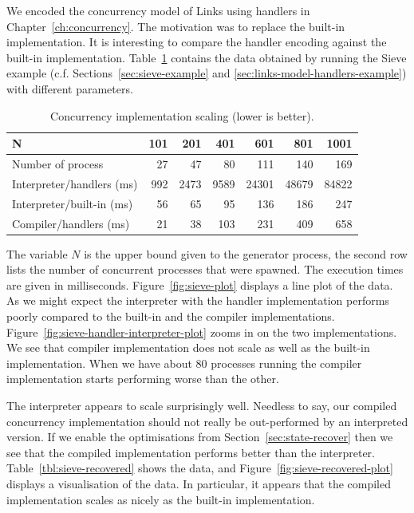 \documentclass[12pt,mscres,cdtppar,twoside,openright,logo,rightchapter,normalheadings]{infthesis}
\theoremstyle{definition}
\begin{document}
We encoded the concurrency model of Links using handlers in
Chapter~\ref{ch:concurrency}. The motivation was to replace the
built-in implementation. It is interesting to compare the handler
encoding against the built-in implementation. Table~\ref{tbl:sieve}
contains the data obtained by running the Sieve example
(c.f. Sections~\ref{sec:sieve-example} and
\ref{sec:links-model-handlers-example}) with different parameters. 
\begin{table}[H]
\centering
\begin{tabular}{| l | r | r | r | r | r | r |}
\hline
N  & 101 & 201 & 401 & 601 & 801 & 1001\\
\hline
Number of process & 27 & 47 & 80 & 111 & 140 & 169\\
\hline
\hline
  Interpreter/handlers (ms) & 992  & 2473 & 9589 & 24301  & 48679  & 84822\\
\hline
  Interpreter/built-in (ms) & 56 & 65 & 95 & 136 & 186 & 247\\
\hline
  Compiler/handlers    (ms) & 21 & 38 & 103 & 231  & 409  & 658\\
\hline
\end{tabular}
\caption{Concurrency implementation scaling (lower is better).}\label{tbl:sieve}
\end{table}
The variable $N$ is the upper bound given to the generator process,
the second row lists the number of concurrent processes that were
spawned. The execution times are given in
milliseconds. Figure~\ref{fig:sieve-plot} displays a line plot of the
data. As we might expect the interpreter with the handler
implementation performs poorly compared to the built-in and the
compiler
implementations. Figure~\ref{fig:sieve-handler-interpreter-plot} zooms
in on the two implementations. We see that compiler implementation
does not scale as well as the built-in implementation. When we have
about 80 processes running the compiler implementation starts
performing worse than the other.

The interpreter appears to scale surprisingly well. Needless to say,
our compiled concurrency implementation should not really be
out-performed by an interpreted version. If we enable the
optimisations from Section~\ref{sec:state-recover} then we see that
the compiled implementation performs better than the
interpreter. Table~\ref{tbl:sieve-recovered} shows the data, and
Figure~\ref{fig:sieve-recovered-plot} displays a visualisation of the
data. In particular, it appears that the compiled implementation
scales as nicely as the built-in implementation.
\end{document}

